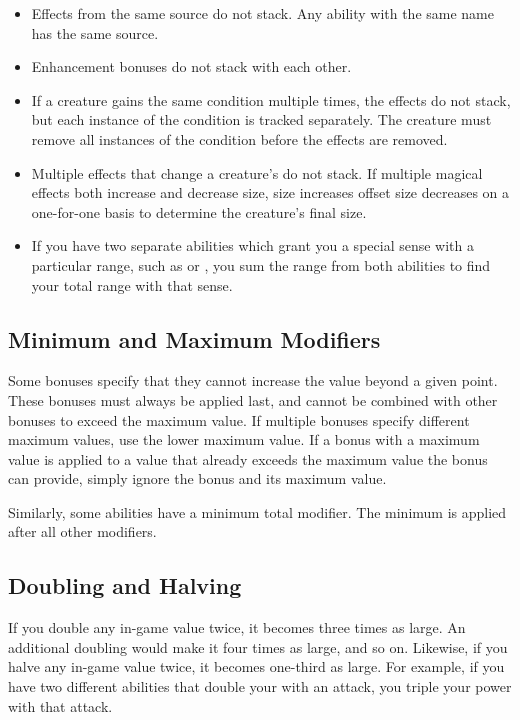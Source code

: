 
        \begin{itemize}
            \item Effects from the same source do not stack. Any ability with the same name has the same source.
            \item Enhancement bonuses do not stack with each other.
            \item If a creature gains the same condition multiple times, the effects do not stack, but each instance of the condition is tracked separately.
                The creature must remove all instances of the condition before the effects are removed.
            \item Multiple \magical effects that change a creature's  do not stack.
                If multiple magical effects both increase and decrease size, size increases offset size decreases on a one-for-one basis to determine the creature's final size.
            \item If you have two separate abilities which grant you a special sense with a particular range, such as  or , you sum the range from both abilities to find your total range with that sense.
        \end{itemize}

    \subsection{Minimum and Maximum Modifiers}\label{Minimum and Maximum Modifiers}
        Some bonuses specify that they cannot increase the value beyond a given point.
        These bonuses must always be applied last, and cannot be combined with other bonuses to exceed the maximum value.
        If multiple bonuses specify different maximum values, use the lower maximum value.
        If a bonus with a maximum value is applied to a value that already exceeds the maximum value the bonus can provide, simply ignore the bonus and its maximum value.

        Similarly, some abilities have a minimum total modifier.
        The minimum is applied after all other modifiers.

    \subsection{Doubling and Halving}\label{Doubling and Halving}
        If you double any in-game value twice, it becomes three times as large.
        An additional doubling would make it four times as large, and so on.
        Likewise, if you halve any in-game value twice, it becomes one-third as large.
        For example, if you have two different abilities that double your  with an attack, you triple your power with that attack.

